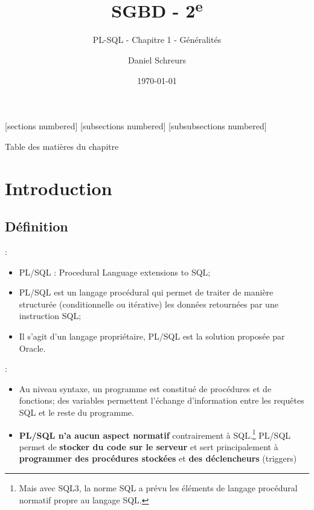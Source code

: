 \documentclass[10pt]{beamer}
\title{SGBD - 2\textsuperscript{e}}
\subtitle{PL-SQL - Chapitre 1 - Généralités}
\date{\today}
\author{Daniel Schreurs}
\institute{Haute École de la Province de Liège}
\begin{document}
\maketitle

[sections numbered]
[subsections numbered]
[subsubsections numbered]
\begin{frame}[allowframebreaks]{Table des matières du chapitre}
    \tableofcontents[subsectionstyle=show/show/hide,subsubsectionstyle=show/show/hide,]
\end{frame}

\section{Introduction}
\tocss
\subsection{Définition}
\begin{frame}{\secname : \subsecname}
    \begin{itemize}
        \item PL/SQL : Procedural Language extensions to SQL;
        \item PL/SQL est un langage procédural qui permet de traiter de manière structurée (conditionnelle ou itérative) les données retournées par une instruction SQL;
        \item Il s'agit d'un langage propriétaire, PL/SQL est la solution proposée par Oracle.
    \end{itemize}
\end{frame}

\begin{frame}{\secname : \subsecname}
    \begin{itemize}
        \item Au niveau syntaxe, un programme est constitué de procédures et de fonctions; des variables permettent l'échange d'information entre les requêtes SQL et le reste du programme.
        \item \textbf{PL/SQL n'a aucun aspect normatif} contrairement à SQL.\footnote{Mais avec SQL3, la norme SQL a prévu les éléments de langage procédural normatif propre au langage SQL.}
              PL/SQL permet de \textbf{stocker du code sur le serveur} et sert principalement à \textbf{programmer des procédures stockées} et \textbf{des déclencheurs} (triggers)
    \end{itemize}
\end{frame}
\end{document}
